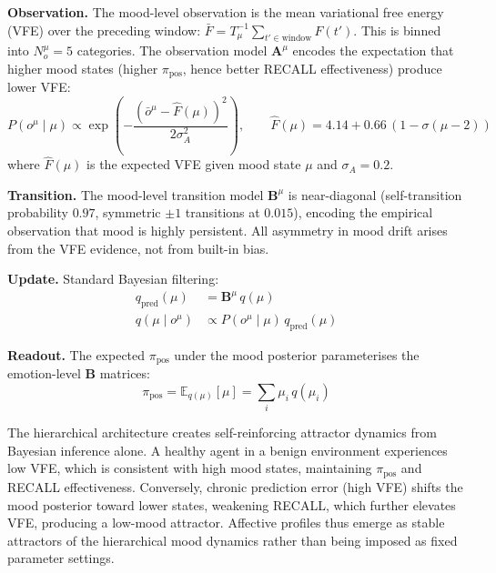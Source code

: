 \documentclass[11pt,a4paper]{article}
\begin{document}
\textbf{Observation.} The mood-level observation is the mean variational free energy (VFE) over the preceding window: $\bar{F} = T_\mu^{-1} \sum_{t' \in \text{window}} F(t')$. This is binned into $N_o^\mu = 5$ categories. The observation model $\mathbf{A}^\mu$ encodes the expectation that higher mood states (higher $\pi_{\text{pos}}$, hence better RECALL effectiveness) produce lower VFE:
\begin{equation}
    P(o^\mu \mid \mu) \propto \exp\!\left( -\frac{(\bar{o}^\mu - \hat{F}(\mu))^2}{2\sigma_A^2} \right), \qquad \hat{F}(\mu) = 4.14 + 0.66\,(1 - \sigma(\mu - 2))
\end{equation}
where $\hat{F}(\mu)$ is the expected VFE given mood state $\mu$ and $\sigma_A = 0.2$.

\textbf{Transition.} The mood-level transition model $\mathbf{B}^\mu$ is near-diagonal (self-transition probability $0.97$, symmetric $\pm 1$ transitions at $0.015$), encoding the empirical observation that mood is highly persistent. All asymmetry in mood drift arises from the VFE evidence, not from built-in bias.

\textbf{Update.} Standard Bayesian filtering:
\begin{align}
    q_{\text{pred}}(\mu) &= \mathbf{B}^\mu\, q(\mu) \\
    q(\mu \mid o^\mu) &\propto P(o^\mu \mid \mu)\, q_{\text{pred}}(\mu)
\end{align}

\textbf{Readout.} The expected $\pi_{\text{pos}}$ under the mood posterior parameterises the emotion-level $\mathbf{B}$ matrices:
\begin{equation}
    \pi_{\text{pos}} = \mathbb{E}_{q(\mu)}[\mu] = \sum_i \mu_i\, q(\mu_i)
\end{equation}

The hierarchical architecture creates self-reinforcing attractor dynamics from Bayesian inference alone. A healthy agent in a benign environment experiences low VFE, which is consistent with high mood states, maintaining $\pi_{\text{pos}}$ and RECALL effectiveness. Conversely, chronic prediction error (high VFE) shifts the mood posterior toward lower states, weakening RECALL, which further elevates VFE, producing a low-mood attractor. Affective profiles thus emerge as stable attractors of the hierarchical mood dynamics rather than being imposed as fixed parameter settings.
\end{document}
